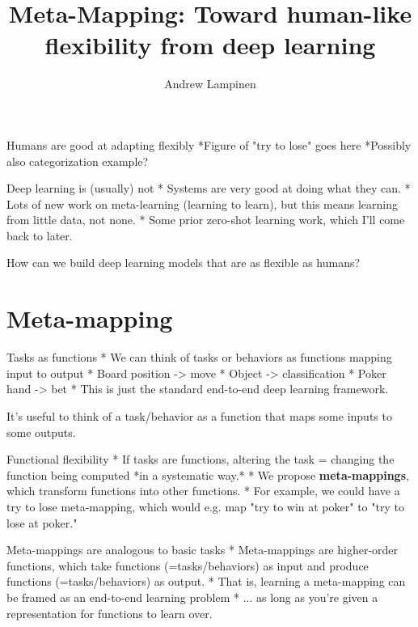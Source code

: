 \documentclass{beamer}
\begin{document}
\title{Meta-Mapping: Toward human-like flexibility from deep learning}
\author{Andrew Lampinen}
\date{}
\frame{\titlepage}

\begin{frame}{Humans are good at adapting flexibly}
*Figure of "try to lose" goes here
*Possibly also categorization example?
\end{frame}

\begin{frame}{Deep learning is (usually) not}
* Systems are very good at doing what they can.
* Lots of new work on meta-learning (learning to learn), but this means learning from little data, not none.
* Some prior zero-shot learning work, which I'll come back to later.
\end{frame}

\begin{frame}[standout]
How can we build deep learning models that are as flexible as humans?
\end{frame}

\section{Meta-mapping}

\begin{frame}{Tasks as functions}
* We can think of tasks or behaviors as functions mapping input to output
    * Board position -> move
    * Object -> classification
    * Poker hand -> bet
* This is just the standard end-to-end deep learning framework.
\end{frame}

\begin{frame}[standout]
It's useful to think of a task/behavior as a function that maps some inputs to some outputs.
\end{frame}

\begin{frame}{Functional flexibility}
* If tasks are functions, altering the task = changing the function being computed *in a systematic way.*
* We propose \textbf{meta-mappings}, which transform functions into other functions.
* For example, we could have a try to lose meta-mapping, which would e.g. map "try to win at poker" to "try to lose at poker."
\end{frame}

\begin{frame}{Meta-mappings are analogous to basic tasks}
* Meta-mappings are higher-order functions, which take functions (=tasks/behaviors) as input and produce functions (=tasks/behaviors) as output.
* That is, learning a meta-mapping can be framed as an end-to-end learning problem
* ... as long as you're given a representation for functions to learn over.
\end{frame}
\end{document}
